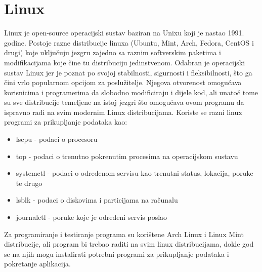 \documentclass[zavrsnirad]{fer}
\begin{document}
\section{Linux}
Linux je open-source operacijski sustav baziran na Unixu koji je nastao 1991. godine. Postoje razne distribucije linuxa (Ubuntu, Mint, Arch, Fedora, CentOS i drugi) koje uključuju jezgru zajedno sa raznim softverskim paketima i modifikacijama koje čine tu distribuciju jedinstvenom. Odabran je operacijski sustav Linux jer je poznat po svojoj stabilnosti, sigurnosti i fleksibilnosti, što ga čini vrlo popularnom opcijom za poslužitelje. Njegova otvorenost omogućava korisnicima i programerima da slobodno modificiraju i dijele kod, ali unatoč tome su sve distribucije temeljene na istoj jezgri što omogućava ovom programu da ispravno radi na svim modernim Linux distribucijama.
Koriste se razni linux programi za prikupljanje podataka kao:
\begin{itemize}
	\item  lscpu - podaci o procesoru
	\item top - podaci o trenutno pokrenutim procesima na operacijskom sustavu
	\item systemctl - podaci o određenom servisu kao trenutni status, lokacija, poruke te drugo
	\item lsblk -  podaci o diskovima i particijama na računalu
	\item journalctl - poruke koje je određeni servis poslao
\end{itemize}
Za programiranje i testiranje programa su korištene Arch Linux i Linux Mint distribucije, ali program bi trebao raditi na svim linux distribucijama, dokle god se na njih mogu instalirati potrebni programi za prikupljanje podataka i pokretanje aplikacija.
\end{document}
